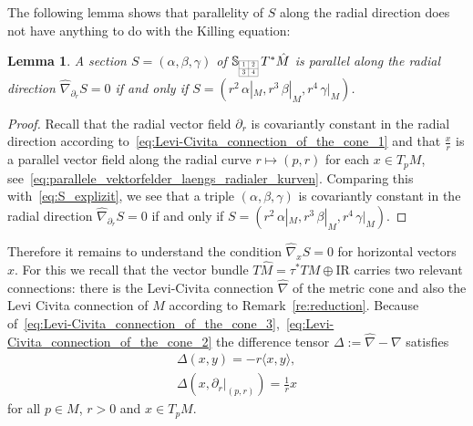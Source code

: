 \documentclass[11pt,a4paper]{article}
\theoremstyle{plain}
\newtheorem{lemma}{Lemma}
\theoremstyle{remark}
\newcommand{\R}{\mathrm{I\!R}}
\newcommand{\bbS}{\mathbb{S}}
\def\pd{\partial}
\begin{document}
The following lemma shows that parallelity of $S$ along the radial direction does
not have anything to do with the Killing equation:


\bigskip
\begin{lemma}\label{le:parallel_in_the_radial_direction}
A section $S = (\alpha,\beta,\gamma)$ of  $\bbS_{\scaleto{\begin{array}{|c|c|}
\cline{1-2}
1 & 2 \\
\cline{1-2}
3 & 4 \\
\cline{1-2}
\end{array}}{12pt}}\, T^*\hat M$ 
is parallel along the radial direction $\hat\nabla_{\pd_r} S = 0$ if and only if $S = (r^2\,\alpha|_M,r^3\, \beta|_M,r^4\,\gamma|_M)$.
\end{lemma}
\begin{proof}
Recall that the radial vector field $\pd_r$ is covariantly constant in the radial direction according to~\eqref{eq:Levi-Civita_connection_of_the_cone_1} and
that $\frac{x}{r}$ is a parallel vector field along the radial curve $r\mapsto (p,r)$ for each $x\in T_pM$, see~\eqref{eq:parallele_vektorfelder_laengs_radialer_kurven}.
Comparing this with~\eqref{eq:S_explizit}, we see that a triple  $(\alpha,\beta,\gamma)$ is covariantly constant in the radial direction $\hat\nabla_{\pd_r} S = 0$ if and only if $S = (r^2\, \alpha|_M,r^3\, \beta|_M,r^4\, \gamma|_M)$.
\end{proof}




Therefore it remains to understand the condition  $\hat\nabla_x S = 0$ for horizontal vectors $x$.
For this we recall that the vector bundle $T\hat M = \tau^*TM \oplus \R$ carries two relevant
connections: there is the Levi-Civita connection $\hat \nabla$ of the metric 
cone and also the Levi Civita connection of $M$ according to Remark~\ref{re:reduction}. Because
of~\eqref{eq:Levi-Civita_connection_of_the_cone_3},~\eqref{eq:Levi-Civita_connection_of_the_cone_2}
the difference tensor $\Delta := \hat \nabla - \nabla $ satisfies
\begin{equation}\label{eq:Delta}
\begin{array}{l} \Delta(x,y) = - r\langle x,y \rangle,\\
\Delta(x,\pd_r|_{(p,r)}) = \frac{1}{r} x
\end{array}
\end{equation}
for all $p\in M$, $r>0$ and $x\in T_pM$.
\end{document}

